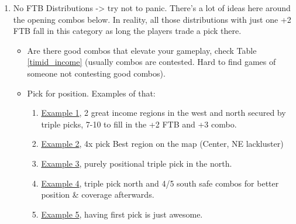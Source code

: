 \begin{enumerate}
\begin{itemize}
        \begin{itemize}
            \item "Naked Willie Object" - Red +2 on the West is 99\% of the time great.
            \item The blue +2 "Turtle Bay" in the south is suspicious (40\% WR in games above >1800 Rating)
            \item "Gaussian Hill" Green +2 in the center as an FTB with blue +3 sure, other 2 options extremely situational to the board. For example \href{https://www.warzone.com/MultiPlayer?GameID=31724929}{here} it would have to expand in a bonus around T3/T4 that by then it would be controlled by 2 regions richer in income and with better bonuses (west +4 and north +3).
            \item "QuickMarch" light blue +2 center, "Artificial World Peace" pink +2 and "Ninja Fortress" +2 north usually fantastic.
        \end{itemize}
    \end{itemize}
    \item No FTB Distributions -> try not to panic. There's a lot of ideas here around the opening combos below. In reality, all those distributions with just one +2 FTB fall in this category as long the players trade a pick there.
    \begin{itemize}
        \item Are there good combos that elevate your gameplay, check Table \ref{timid_income} (usually combos are contested. Hard to find games of someone not contesting good combos).
        \item Pick for position. Examples of that:
        \begin{enumerate}
            \item \href{https://www.warzone.com/MultiPlayer?GameID=31724929}{Example 1}, 2 great income regions in the west and north secured by triple picks, 7-10 to fill in the +2 FTB and +3 combo.
            \item \href{https://www.warzone.com/MultiPlayer?GameID=40511669}{Example 2}, 4x pick Best region on the map (Center, NE lackluster)
            \item \href{https://www.warzone.com/MultiPlayer?GameID=36199328}{Example 3}, purely positional triple pick in the north.
            \item \href{https://www.warzone.com/MultiPlayer?GameID=36192739}{Example 4}, triple pick north and 4/5 south safe combos for better position \& coverage afterwards.
            \item \href{https://www.warzone.com/MultiPlayer?GameID=35897078}{Example 5}, having first pick is just awesome.
        \end{enumerate}
    \end{itemize}
\end{enumerate}


